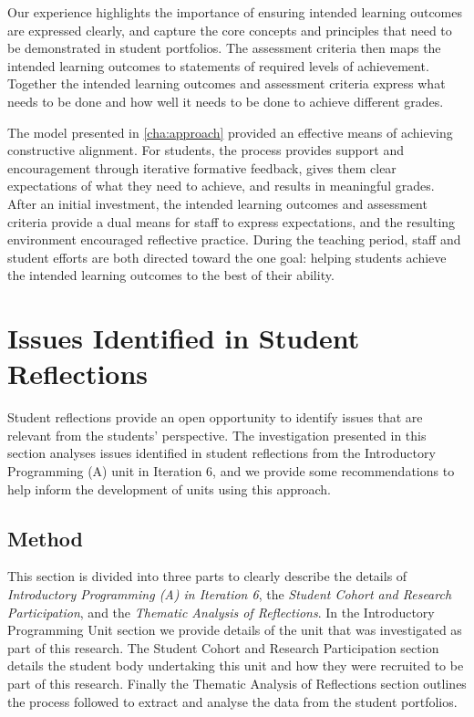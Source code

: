 Our experience highlights the importance of ensuring intended learning outcomes are expressed clearly, and capture the core concepts and principles that need to be demonstrated in student portfolios. The assessment criteria then maps the intended learning outcomes to statements of required levels of achievement. Together the intended learning outcomes and assessment criteria express what needs to be done and how well it needs to be done to achieve different grades.

The model presented in \cref{cha:approach} provided an effective means of achieving constructive alignment. For students, the process provides support and encouragement through iterative formative feedback, gives them clear expectations of what they need to achieve, and results in meaningful grades. After an initial investment, the intended learning outcomes and assessment criteria provide a dual means for staff to express expectations, and the resulting environment encouraged reflective practice. During the teaching period, staff and student efforts are both directed toward the one goal: helping students achieve the intended learning outcomes to the best of their ability.


\clearpage
\section{Issues Identified in Student Reflections} %
\label{sec:issues_identified_in_student_reflections}

Student reflections provide an open opportunity to identify issues that are relevant from the students' perspective. The investigation presented in this section analyses issues identified in student reflections from the Introductory Programming (A) unit in Iteration 6, and we provide some recommendations to help inform the development of units using this approach. 


\subsection{Method} %
\label{sub:issues_method}

This section is divided into three parts to clearly describe the details of \emph{Introductory Programming (A) in Iteration 6}, the \emph{Student Cohort and Research Participation}, and the \emph{Thematic Analysis of Reflections}. In the Introductory Programming Unit section we provide details of the unit that was investigated as part of this research. The Student Cohort and Research Participation section details the student body undertaking this unit and how they were recruited to be part of this research. Finally the Thematic Analysis of Reflections section outlines the process followed to extract and analyse the data from the student portfolios.

